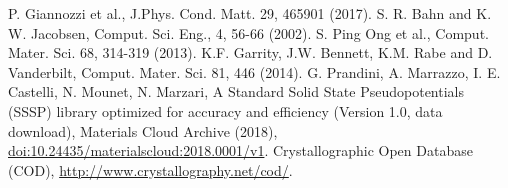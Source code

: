 
\begin{thebibliography}{9}
%
P. Giannozzi et al., J.Phys. Cond. Matt. 29, 465901 (2017).
S. R. Bahn and K. W. Jacobsen, %
Comput. Sci. Eng., 4, 56-66 (2002).
 S. Ping Ong et al., %
Comput. Mater. Sci. 68, 314-319 (2013). %
K.F. Garrity, J.W. Bennett, K.M. Rabe and D. Vanderbilt, Comput. Mater. Sci. 81, 446 (2014).
G. Prandini, A. Marrazzo, I. E. Castelli, N. Mounet, N. Marzari, A Standard Solid State Pseudopotentials (SSSP) library optimized for accuracy and efficiency (Version 1.0, data download), Materials Cloud Archive (2018), \href{http://doi.org/10.24435/materialscloud:2018.0001/v1}{doi:10.24435/materialscloud:2018.0001/v1}.
Crystallographic Open Database ({COD}), \href{http://www.crystallography.net/cod/}{http://www.crystallography.net/cod/}.
\end{thebibliography}
